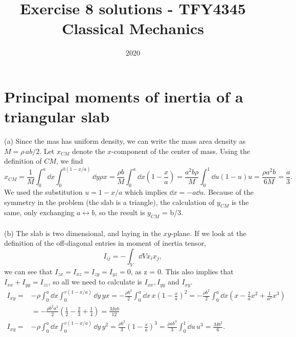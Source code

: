 \documentclass{article}
\title{Exercise 8 solutions - TFY4345 Classical Mechanics}
\date{2020}
\begin{document}
    \maketitle
    \section{Principal moments of inertia of a triangular slab}
        (a) Since the mas has uniform density, we can write the mass area density as $M =   \rho \, ab/2$. Let $x_{CM}$ denote the $x$-component of the center of mass. Using the definition of $CM$, we find
        \begin{equation*}
            x_{CM} = \frac{1}{M} \int_0^a \dd x \int_0^{b(1 - x / a)} \dd y \rho x = \frac{\rho b}{M} \int_0^a \dd x \left( 1 - \frac{x}{a}\right) = \frac{a^2 b \rho}{M} \int_0^1 \dd u (1 - u)u = \frac{\rho a^2 b}{6M} = \frac{a}{3}. 
        \end{equation*}
        We used the substitution $u = 1 - x/a$ which implies $ \dd x = - a \dd u $. Because of the symmetry in the problem (the slab is a triangle), the calculation of $y_{CM}$ is the same, only exchanging $ a \leftrightarrow b $, so the result is $y_{CM}$ = b/3. 
        \\ \\
        (b) The slab is two dimensional, and laying in the $xy$-plane. If we look at the definition of the off-diagonal entries in moment of inertia tensor,
        \begin{equation*}
            I_{ij} = - \int_V \dd V x_ix_j,
        \end{equation*} 
        we can see that $I_{zx} = I_{xz} = I_{zy} = I_{yz} = 0$, as  z = 0. This also implies that $I_{xx} + I_{yy} = I_{zz}$, so all we need to calculate is $I_{xx}, I_{yy}$ and $I_{xy}$.
        \begin{align*}
            I_{xy} =& -\rho \int_0^a \dd x \int_0^{v(1 - x/a)} \dd y \, yx 
            = - \frac{\rho b^2}{2}\int_0^a \dd x\, x \left( 1 - \frac{x}{a} \right)^2 
            = - \frac{\rho b^2}{2} \int_0^a \dd x \left( x - \frac{2}{a}x^2 + \frac{1}{a^2} x^3\right) \\
            &= -\frac{\rho b^2 a^2}{2}\left( \frac{1}{2} - \frac{2}{3} + \frac{1}{4} \right) = \frac{M a b}{12} \\
            I_{xy} = & -\rho \int_0^a \dd x \int_0^{v(1 - x/a)} \dd y \,y^2 
            = \frac{\rho b^3}{3} \left(1 - \frac{x}{a}\right)^3 = \frac{\rho a b^3}{3} \int_0^1 \dd u \,u^3 = \frac{M b^2}{6}.
        \end{align*} 
\end{document}
